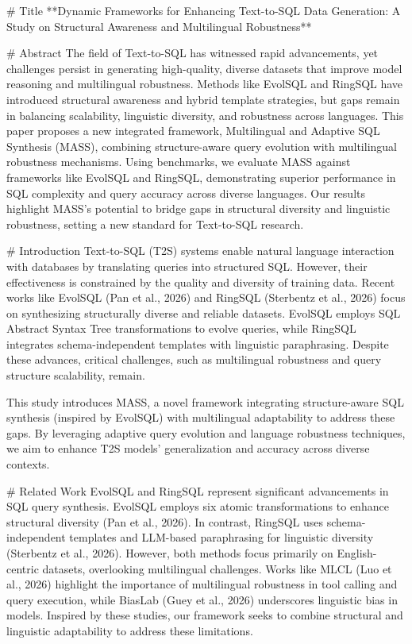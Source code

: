 # Title  
**Dynamic Frameworks for Enhancing Text-to-SQL Data Generation: A Study on Structural Awareness and Multilingual Robustness**

# Abstract  
The field of Text-to-SQL has witnessed rapid advancements, yet challenges persist in generating high-quality, diverse datasets that improve model reasoning and multilingual robustness. Methods like EvolSQL and RingSQL have introduced structural awareness and hybrid template strategies, but gaps remain in balancing scalability, linguistic diversity, and robustness across languages. This paper proposes a new integrated framework, Multilingual and Adaptive SQL Synthesis (MASS), combining structure-aware query evolution with multilingual robustness mechanisms. Using benchmarks, we evaluate MASS against frameworks like EvolSQL and RingSQL, demonstrating superior performance in SQL complexity and query accuracy across diverse languages. Our results highlight MASS's potential to bridge gaps in structural diversity and linguistic robustness, setting a new standard for Text-to-SQL research.

# Introduction  
Text-to-SQL (T2S) systems enable natural language interaction with databases by translating queries into structured SQL. However, their effectiveness is constrained by the quality and diversity of training data. Recent works like EvolSQL (Pan et al., 2026) and RingSQL (Sterbentz et al., 2026) focus on synthesizing structurally diverse and reliable datasets. EvolSQL employs SQL Abstract Syntax Tree transformations to evolve queries, while RingSQL integrates schema-independent templates with linguistic paraphrasing. Despite these advances, critical challenges, such as multilingual robustness and query structure scalability, remain.

This study introduces MASS, a novel framework integrating structure-aware SQL synthesis (inspired by EvolSQL) with multilingual adaptability to address these gaps. By leveraging adaptive query evolution and language robustness techniques, we aim to enhance T2S models' generalization and accuracy across diverse contexts.

# Related Work  
EvolSQL and RingSQL represent significant advancements in SQL query synthesis. EvolSQL employs six atomic transformations to enhance structural diversity (Pan et al., 2026). In contrast, RingSQL uses schema-independent templates and LLM-based paraphrasing for linguistic diversity (Sterbentz et al., 2026). However, both methods focus primarily on English-centric datasets, overlooking multilingual challenges. Works like MLCL (Luo et al., 2026) highlight the importance of multilingual robustness in tool calling and query execution, while BiasLab (Guey et al., 2026) underscores linguistic bias in models. Inspired by these studies, our framework seeks to combine structural and linguistic adaptability to address these limitations.

